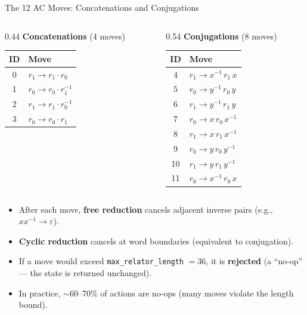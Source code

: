 \documentclass[aspectratio=169,11pt]{beamer}
\newcommand{\inv}[1]{#1^{-1}}
\begin{document}
\begin{frame}{The 12 AC Moves: Concatenations and Conjugations}
  \footnotesize
  \begin{columns}[T]
    \begin{column}{0.44\textwidth}
      \textbf{Concatenations} (4 moves)\\[2pt]
      \scriptsize
      \begin{tabular}{cl}
        \toprule
        \textbf{ID} & \textbf{Move} \\
        \midrule
        0 & $r_1 \to r_1 \cdot r_0$ \\
        1 & $r_0 \to r_0 \cdot \inv{r_1}$ \\
        2 & $r_1 \to r_1 \cdot \inv{r_0}$ \\
        3 & $r_0 \to r_0 \cdot r_1$ \\
        \bottomrule
      \end{tabular}
    \end{column}
    \begin{column}{0.54\textwidth}
      \textbf{Conjugations} (8 moves)\\[2pt]
      \scriptsize
      \begin{tabular}{cl}
        \toprule
        \textbf{ID} & \textbf{Move} \\
        \midrule
        4  & $r_1 \to \inv{x}\, r_1\, x$ \\
        5  & $r_0 \to \inv{y}\, r_0\, y$ \\
        6  & $r_1 \to \inv{y}\, r_1\, y$ \\
        7  & $r_0 \to x\, r_0\, \inv{x}$ \\
        8  & $r_1 \to x\, r_1\, \inv{x}$ \\
        9  & $r_0 \to y\, r_0\, \inv{y}$ \\
        10 & $r_1 \to y\, r_1\, \inv{y}$ \\
        11 & $r_0 \to \inv{x}\, r_0\, x$ \\
        \bottomrule
      \end{tabular}
    \end{column}
  \end{columns}

  \bigskip
  \begin{itemize}\setlength\itemsep{2pt}
    \item After each move, \textbf{free reduction} cancels adjacent inverse pairs
      (e.g., $x\inv{x} \to \varepsilon$).
    \item \textbf{Cyclic reduction} cancels at word boundaries (equivalent to conjugation).
    \item If a move would exceed \texttt{max\_relator\_length} $= 36$, it is \textbf{rejected}
      (a ``no-op'' --- the state is returned unchanged).
    \item In practice, $\sim$60--70\% of actions are no-ops (many moves violate the length bound).
  \end{itemize}
\end{frame}
\end{document}
